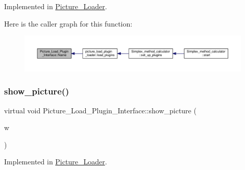 Implemented in \hyperlink{classPicture__Loader_a043165c946b7bf29dea761463b8cb5fa}{Picture\+\_\+\+Loader}.

Here is the caller graph for this function\+:\nopagebreak
\begin{figure}[H]
\begin{center}
\leavevmode
\includegraphics[width=350pt]{classPicture__Load__Plugin__Interface_a7cb4c7354f06bc7408ce1072e46db030_icgraph}
\end{center}
\end{figure}
\mbox{\label{classPicture__Load__Plugin__Interface_a2d90e62b277854046ebcdac8ffadf0d5}} 
\subsubsection{\texorpdfstring{show\+\_\+picture()}{show\_picture()}\hspace{0.1cm}{\footnotesize\ttfamily [1/2]}}
{\footnotesize\ttfamily virtual void Picture\+\_\+\+Load\+\_\+\+Plugin\+\_\+\+Interface\+::show\+\_\+picture (\begin{DoxyParamCaption}\item[{Q\+Main\+Window $\ast$}]{w }\end{DoxyParamCaption})\hspace{0.3cm}{\ttfamily [pure virtual]}}



Implemented in \hyperlink{classPicture__Loader_af4127aaea7066112b2368adda46a82b0}{Picture\+\_\+\+Loader}.

\mbox{\label{classPicture__Load__Plugin__Interface_a2d90e62b277854046ebcdac8ffadf0d5}} 
